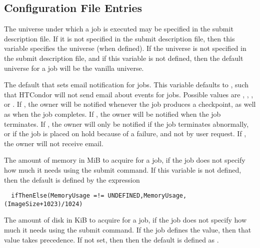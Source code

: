 \subsection{\label{sec:Submit-Config-File-Entries}
Configuration File Entries}

\begin{description}
\label{param:DefaultUniverse}
\item[\Macro{DEFAULT\_UNIVERSE}]
  The universe under which a job is executed may be specified in the submit
  description file.
  If it is not specified in the submit description file, then
  this variable specifies the universe (when defined).
  If the universe is not specified in the submit description
  file, and if this variable is not defined, then
  the default universe for a job will be the vanilla universe.

\label{param:JobDefaultNotification}
\item[\Macro{JOB\_DEFAULT\_NOTIFICATION}]
  The default that sets email notification for jobs. 
  This variable defaults to ,
  such that HTCondor will not send email about events for jobs. 
  Possible values are
  , , , or . 
  If , the owner will be notified whenever the job produces a
  checkpoint, as well as when the job completes. 
  If , the owner will be notified when the job terminates.
  If , the owner
  will only be notified if the job terminates abnormally, 
  or if the job is placed on hold because of a failure, 
  and not by user request. 
  If , the owner will not receive email. 

\label{param:JobDefaultRequestMemory}
\item[\Macro{JOB\_DEFAULT\_REQUESTMEMORY}]
  The amount of memory in MiB to acquire for a job, 
  if the job does not specify how much it needs using the 
   submit command.
  If this variable is not defined, then the default is defined by
  the expression
\begin{verbatim}
  ifThenElse(MemoryUsage =!= UNDEFINED,MemoryUsage,(ImageSize+1023)/1024)
\end{verbatim}

\label{param:JobDefaultRequestDisk}
\item[\Macro{JOB\_DEFAULT\_REQUESTDISK}]
  The amount of disk in  KiB to acquire for a job,
  if the job does not specify how much it needs using the 
   submit command.
  If the job defines the value, then that value takes precedence. 
  If not set, then then the default is defined as .


\end{description}
